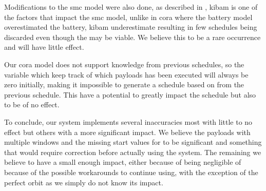 Modifications to the \gls{smc} model were also done, as described in , \gls{kibam} is one of the factors that impact the \gls{smc} model, unlike in \gls{cora} where the battery model overestimated the battery, \gls{kibam} underestimate resulting in few schedules being discarded even though the may be viable. We believe this to be a rare occurrence and will have little effect. 

Our \gls{cora} model does not support knowledge from previous schedules, so the variable  which keep track of which payloads has been executed will always be zero initially, making it impossible to generate a schedule based on  from the previous schedule. This have a potential to greatly impact the schedule but also to be of no effect. 

To conclude, our system implements several inaccuracies most with little to no effect but others with a more significant impact. We believe the payloads with multiple windows and the missing start values for  to be significant and something that would require correction before actually using the system. The remaining we believe to have a small enough impact, either because of being negligible of because of the possible workarounds to continue using, with the exception of the perfect orbit as we simply do not know its impact.





